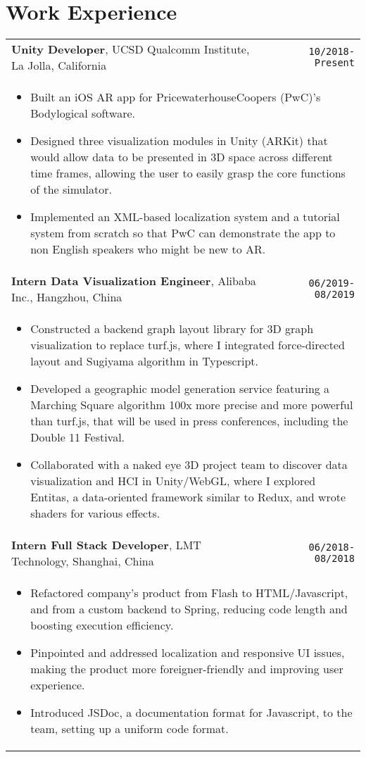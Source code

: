 \documentclass[10pt, letterpaper]{article}
\newcommand{\itemcols}[1]{
\multicolumn{2}{p{\dimexpr \linewidth-2\tabcolsep}}{
\begin{itemize}
#1
\end{itemize}
}
}
\begin{document}
\section{Work Experience}
\smallskip
\noindent
\begin{tabularx}{\textwidth}{X r}
\textbf{\large Unity Developer}, UCSD Qualcomm Institute, La Jolla, California & \texttt{10/2018-Present} \\
\itemcols{
\item Built an iOS AR app for PricewaterhouseCoopers (PwC)'s Bodylogical software.
\item Designed three visualization modules in Unity (ARKit) that would allow data to be presented in 3D space across different time frames, allowing the user to easily grasp the core functions of the simulator.
\item Implemented an XML-based localization system and a tutorial system from scratch so that PwC can demonstrate the app to non English speakers who might be new to AR.
} \\
\textbf{\large Intern Data Visualization Engineer}, Alibaba Inc., Hangzhou, China & \texttt{06/2019-08/2019} \\
\itemcols{
\item Constructed a backend graph layout library for 3D graph visualization to replace turf.js, where I integrated force-directed layout and Sugiyama algorithm in Typescript.
\item Developed a geographic model generation service featuring a Marching Square algorithm 100x more precise and more powerful than turf.js, that will be used in press conferences, including the Double 11 Festival.
\item Collaborated with a naked eye 3D project team to discover data visualization and HCI in Unity/WebGL, where I explored Entitas, a data-oriented framework similar to Redux, and wrote shaders for various effects.
} \\
\textbf{\large Intern Full Stack Developer}, LMT Technology, Shanghai, China & \texttt{06/2018-08/2018} \\
\itemcols{
\item Refactored company's product from Flash to HTML/Javascript, and from a custom backend to Spring, reducing code length and boosting execution efficiency.
\item Pinpointed and addressed localization and responsive UI issues, making the product more foreigner-friendly and improving user experience.
\item Introduced JSDoc, a documentation format for Javascript, to the team, setting up a uniform code format.
} \\
\end{tabularx}
\end{document}
